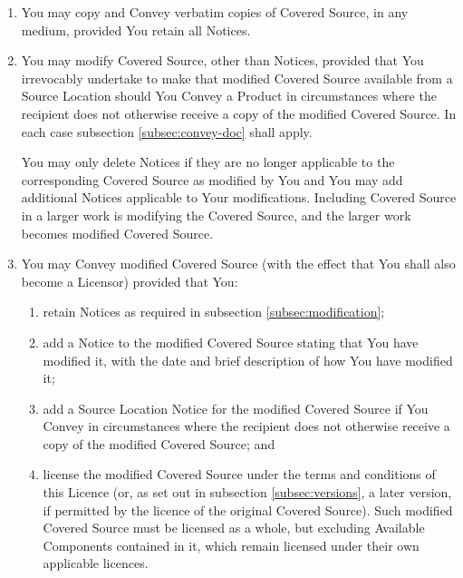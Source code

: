 \documentclass[10pt, a4paper]{article}
\begin{document}
\begin{enumerate}[label=\ref*{sec:copying}.\arabic*]
\item
You may copy and Convey verbatim copies of Covered Source, in any medium, provided You retain all Notices.


  \item \label{subsec:modification} You may modify Covered Source, other than Notices,  provided that You irrevocably undertake to make that modified Covered Source available from a Source Location should You Convey a Product in circumstances where the recipient does not otherwise receive a copy of the modified Covered Source. In each case subsection \ref*{subsec:convey-doc} shall apply.
 
 You may only delete Notices if they are no longer applicable to the corresponding Covered Source as modified by You and You may add additional Notices applicable to Your modifications. Including Covered Source in a larger work is modifying the Covered Source, and the larger work becomes modified Covered Source.

\item
\label{subsec:convey-doc}
You may Convey modified Covered Source (with the effect that You shall also become a Licensor) provided that You:
\begin{enumerate}[label=\alph*)]
\item retain Notices as required in subsection \ref*{subsec:modification};

\item \label{subsubsec:modify-notice} add a Notice to the modified Covered Source stating that You have modified it, with the date and brief description of how You have modified it;


\item add a Source Location Notice for the modified Covered Source if You Convey in circumstances where the recipient does not otherwise receive a copy of the modified Covered Source; and


\item license the modified Covered Source under the terms and conditions of this Licence (or, as set out in subsection \ref*{subsec:versions}, a later version, if permitted by the licence of the original Covered Source). Such modified Covered Source must be licensed as a whole, but excluding Available Components contained in it, which remain licensed under their own applicable licences. 


\end{enumerate}

\end{enumerate}
\end{document}
